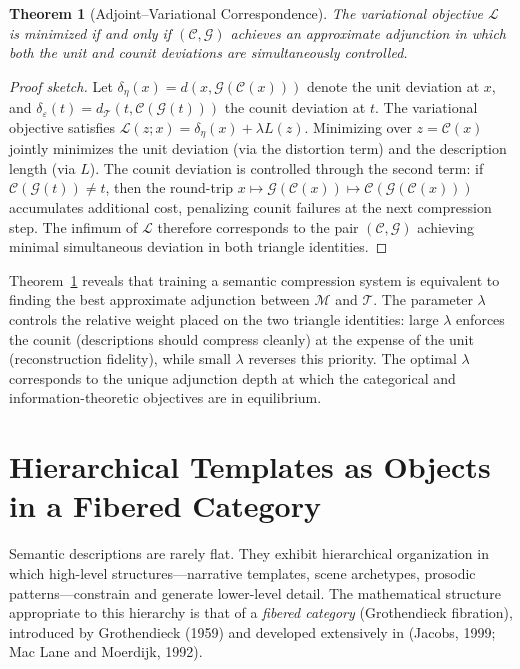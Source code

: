 \documentclass[11pt,a4paper]{article}
\newtheorem{theorem}{Theorem}[section]
\theoremstyle{definition}
\theoremstyle{remark}
\begin{document}
\begin{theorem}[Adjoint--Variational Correspondence]
\label{thm:adj_var}
The variational objective $\mathcal{L}$ is minimized if and only if $(\mathcal{C}, \mathcal{G})$ achieves an approximate adjunction in which both the unit and counit deviations are simultaneously controlled.
\end{theorem}

\begin{proof}[Proof sketch]
Let $\delta_\eta(x) = d(x, \mathcal{G}(\mathcal{C}(x)))$ denote the unit deviation at $x$, and $\delta_\varepsilon(t) = d_\mathcal{T}(t, \mathcal{C}(\mathcal{G}(t)))$ the counit deviation at $t$. The variational objective satisfies $\mathcal{L}(z;x) = \delta_\eta(x) + \lambda L(z)$. Minimizing over $z = \mathcal{C}(x)$ jointly minimizes the unit deviation (via the distortion term) and the description length (via $L$). The counit deviation is controlled through the second term: if $\mathcal{C}(\mathcal{G}(t)) \ne t$, then the round-trip $x \mapsto \mathcal{G}(\mathcal{C}(x)) \mapsto \mathcal{C}(\mathcal{G}(\mathcal{C}(x)))$ accumulates additional cost, penalizing counit failures at the next compression step. The infimum of $\mathcal{L}$ therefore corresponds to the pair $(\mathcal{C}, \mathcal{G})$ achieving minimal simultaneous deviation in both triangle identities.
\end{proof}

Theorem~\ref{thm:adj_var} reveals that training a semantic compression system is equivalent to finding the best approximate adjunction between $\mathcal{M}$ and $\mathcal{T}$. The parameter $\lambda$ controls the relative weight placed on the two triangle identities: large $\lambda$ enforces the counit (descriptions should compress cleanly) at the expense of the unit (reconstruction fidelity), while small $\lambda$ reverses this priority. The optimal $\lambda$ corresponds to the unique adjunction depth at which the categorical and information-theoretic objectives are in equilibrium.

\section{Hierarchical Templates as Objects in a Fibered Category}
\label{sec:fibered}

Semantic descriptions are rarely flat. They exhibit hierarchical organization in which high-level structures---narrative templates, scene archetypes, prosodic patterns---constrain and generate lower-level detail. The mathematical structure appropriate to this hierarchy is that of a \emph{fibered category} (Grothendieck fibration), introduced by Grothendieck (1959) and developed extensively in (Jacobs, 1999; Mac Lane and Moerdijk, 1992).
\end{document}
